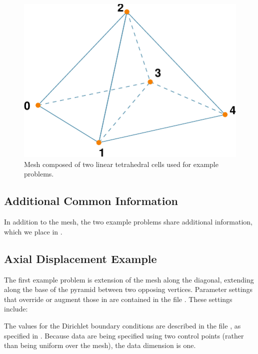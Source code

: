 \begin{figure}
  \includegraphics{examples/figs/twotet4-mesh}
  \caption{Mesh composed of two linear tetrahedral cells used for example problems.}
  \label{fig:twotet4-mesh}
\end{figure}


\subsection{Additional Common Information}

In addition to the mesh, the two example problems share additional
information, which we place in .


\subsection{Axial Displacement Example}

The first example problem is extension of the mesh along the diagonal,
extending along the base of the pyramid between two opposing vertices.
Parameter settings that override or augment those in 
are contained in the file . These settings include:
\begin{inventory}
\end{inventory}
The values for the Dirichlet boundary conditions are described in
the file , as specified in .
Because data are being specified using two control points (rather
than being uniform over the mesh), the data dimension is one.

